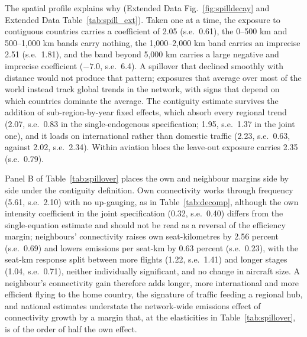 \documentclass[12pt]{article}
\begin{document}
The spatial profile explains why (Extended Data Fig.~\ref{fig:spilldecay}
and Extended Data Table~\ref{tab:spill_ext}). Taken one at a time, the
exposure to contiguous countries carries a coefficient of 2.05 (s.e.\
0.61), the 0--500 km and 500--1{,}000 km bands carry nothing, the
1{,}000--2{,}000 km band carries an imprecise 2.51 (s.e.\ 1.81), and the
band beyond 5{,}000 km carries a large negative and imprecise coefficient
($-7.0$, s.e.\ 6.4). A spillover that declined smoothly with distance
would not produce that pattern; exposures that average over most of the
world instead track global trends in the network, with signs that depend
on which countries dominate the average. The contiguity estimate survives
the addition of sub-region-by-year fixed effects, which absorb every
regional trend (2.07, s.e.\ 0.83 in the single-endogenous specification;
1.95, s.e.\ 1.37 in the joint one), and it loads on international rather
than domestic traffic (2.23, s.e.\ 0.63, against 2.02, s.e.\ 2.34).
Within aviation blocs the leave-out exposure carries 2.35 (s.e.\ 0.79).

Panel B of Table~\ref{tab:spillover} places the own and neighbour margins
side by side under the contiguity definition. Own connectivity works
through frequency (5.61, s.e.\ 2.10) with no up-gauging, as in
Table~\ref{tab:decomp}, although the own intensity coefficient in the
joint specification (0.32, s.e.\ 0.40) differs from the single-equation
estimate and should not be read as a reversal of the efficiency margin;
neighbours' connectivity raises own seat-kilometres by 2.56 percent (s.e.\
0.69) and lowers emissions per seat-km by 0.63 percent (s.e.\ 0.23), with
the seat-km response split between more flights (1.22, s.e.\ 1.41) and
longer stages (1.04, s.e.\ 0.71), neither individually significant, and
no change in aircraft size. A neighbour's connectivity gain therefore
adds longer, more international and more efficient flying to the home
country, the signature of traffic feeding a regional hub, and national
estimates understate the network-wide emissions effect of connectivity
growth by a margin that, at the elasticities in Table~\ref{tab:spillover},
is of the order of half the own effect.
\end{document}
